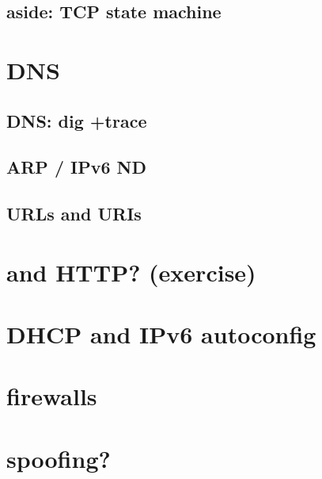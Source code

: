 \subsection{aside: TCP state machine}

\section{DNS}


\subsection{DNS: dig +trace}


\subsection{ARP / IPv6 ND}


\subsection{URLs and URIs}


\section{and HTTP? (exercise)}


\section{DHCP and IPv6 autoconfig}



\section{firewalls} %


\section{spoofing?}

